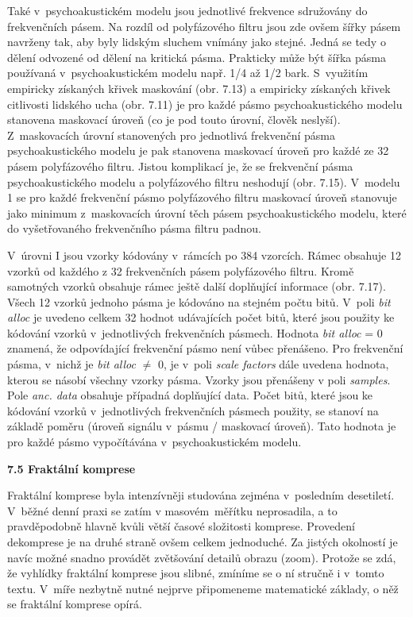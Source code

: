 \noindent 

\noindent Také v~psychoakustickém modelu jsou jednotlivé frekvence sdružovány do frekvenčních pásem. Na rozdíl od polyfázového filtru jsou zde ovšem šířky pásem navrženy tak, aby byly lidským sluchem vnímány jako stejné. Jedná se tedy o dělení odvozené od dělení na kritická pásma. Prakticky může být šířka pásma používaná v~psychoakustickém modelu např. 1/4 až 1/2 bark. S~využitím empiricky získaných křivek maskování (obr. 7.13) a empiricky získaných křivek citlivosti lidského ucha (obr. 7.11) je pro každé pásmo psychoakustického modelu stanovena maskovací úroveň (co je pod touto úrovní, člověk neslyší). Z~maskovacích úrovní stanovených pro jednotlivá frekvenční pásma psychoakustického modelu je pak stanovena maskovací úroveň pro každé ze 32 pásem polyfázového filtru. Jistou komplikací je, že se frekvenční pásma psychoakustického modelu a polyfázového filtru neshodují (obr. 7.15). V~modelu 1 se pro každé frekvenční pásmo polyfázového filtru maskovací úroveň stanovuje jako minimum z~maskovacích úrovní těch pásem psychoakustického modelu, které do vyšetřovaného frekvenčního pásma filtru padnou.

\noindent 

\noindent 

\noindent V~úrovni I jsou vzorky kódovány v~rámcích po 384 vzorcích. Rámec obsahuje 12 vzorků od každého z 32 frekvenčních pásem polyfázového filtru. Kromě samotných vzorků obsahuje rámec ještě další doplňující informace (obr. 7.17). Všech 12 vzorků jednoho pásma je kódováno na stejném počtu bitů. V~poli \textit{bit alloc} je uvedeno celkem 32 hodnot udávajících počet bitů, které jsou použity ke kódování vzorků v~jednotlivých frekvenčních pásmech. Hodnota \textit{bit alloc} = 0 znamená, že odpovídající frekvenční pásmo není vůbec přenášeno. Pro frekvenční pásma, v~nichž je \textit{bit alloc} $\neq$ 0, je v~poli \textit{scale factors} dále uvedena hodnota, kterou se násobí všechny vzorky pásma. Vzorky jsou přenášeny v poli \textit{samples}. Pole \textit{anc. data} obsahuje případná doplňující data. Počet bitů, které jsou ke kódování vzorků v~jednotlivých frekvenčních pásmech použity, se stanoví na základě poměru (úroveň signálu v~pásmu / maskovací úroveň). Tato hodnota je pro každé pásmo vypočítávána v~psychoakustickém modelu.

\noindent \textbf{7.5  Fraktální komprese}

\noindent Fraktální komprese byla intenzívněji studována zejména v~posledním desetiletí. V~běžné denní praxi se zatím v masovém~měřítku neprosadila, a to pravděpodobně hlavně kvůli větší časové složitosti komprese. Provedení dekomprese je na druhé straně ovšem celkem jednoduché. Za jistých okolností je navíc možné snadno provádět zvětšování detailů obrazu (zoom). Protože se zdá, že vyhlídky fraktální komprese jsou slibné, zmíníme se o ní stručně i v~tomto textu. V~míře nezbytně nutné nejprve připomeneme matematické základy, o něž se fraktální komprese opírá.

